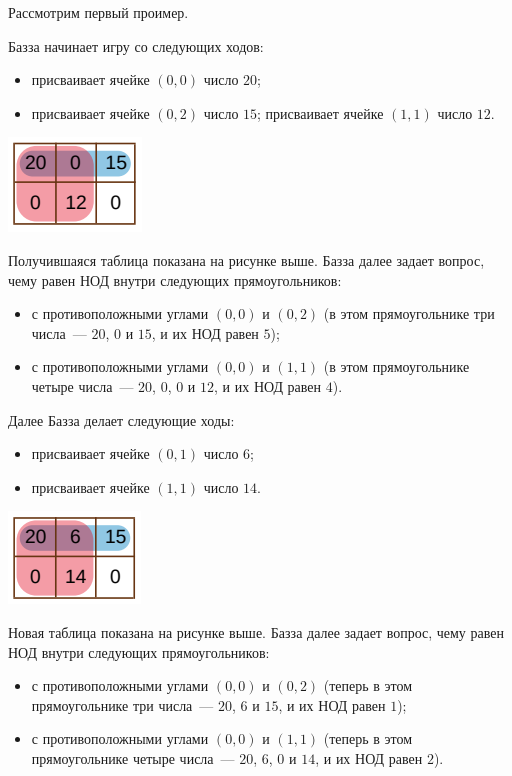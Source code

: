 Рассмотрим первый проимер.

Базза начинает игру со следующих ходов:
\begin{itemize}
\item присваивает ячейке $(0, 0)$ число $20$;
\item присваивает ячейке $(0, 2)$ число $15$; присваивает ячейке $(1, 1)$ число $12$.
\end{itemize}

\includegraphics{1.png}

Получившаяся таблица показана на рисунке выше. Базза далее задает вопрос, чему равен НОД внутри следующих прямоугольников:
\begin{itemize}
\item с противоположными углами $(0, 0)$ и $(0, 2)$ (в этом прямоугольнике три числа~--- $20$, $0$ и $15$, и их НОД равен $5$);
\item с противоположными углами $(0, 0)$ и $(1, 1)$ (в этом прямоугольнике четыре числа~--- $20$, $0$, $0$ и $12$, и их НОД равен $4$).
\end{itemize}

Далее Базза делает следующие ходы:
\begin{itemize}
\item присваивает ячейке $(0, 1)$ число $6$;
\item присваивает ячейке $(1, 1)$ число $14$.
\end{itemize}

\includegraphics{2.png}

Новая таблица показана на рисунке выше. Базза далее задает вопрос, чему равен НОД внутри следующих прямоугольников:
\begin{itemize}
\item с противоположными углами $(0, 0)$ и $(0, 2)$ (теперь в этом прямоугольнике три числа~--- $20$, $6$ и $15$, и их НОД равен $1$);
\item с противоположными углами $(0, 0)$ и $(1, 1)$ (теперь в этом прямоугольнике четыре числа~--- $20$, $6$, $0$ и $14$, и их НОД равен $2$).
\end{itemize}